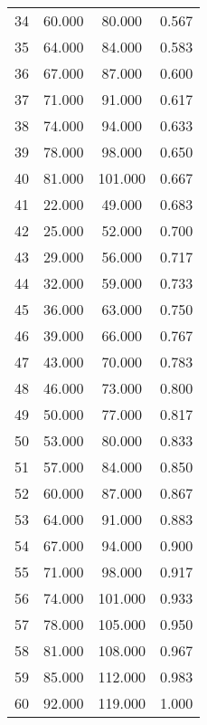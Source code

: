 \begin{tabular}{cccc}
  34 & 60.000 & 80.000 & 0.567 \\ 
  35 & 64.000 & 84.000 & 0.583 \\ 
  36 & 67.000 & 87.000 & 0.600 \\ 
  37 & 71.000 & 91.000 & 0.617 \\ 
  38 & 74.000 & 94.000 & 0.633 \\ 
  39 & 78.000 & 98.000 & 0.650 \\ 
  40 & 81.000 & 101.000 & 0.667 \\ 
  41 & 22.000 & 49.000 & 0.683 \\ 
  42 & 25.000 & 52.000 & 0.700 \\ 
  43 & 29.000 & 56.000 & 0.717 \\ 
  44 & 32.000 & 59.000 & 0.733 \\ 
  45 & 36.000 & 63.000 & 0.750 \\ 
  46 & 39.000 & 66.000 & 0.767 \\ 
  47 & 43.000 & 70.000 & 0.783 \\ 
  48 & 46.000 & 73.000 & 0.800 \\ 
  49 & 50.000 & 77.000 & 0.817 \\ 
  50 & 53.000 & 80.000 & 0.833 \\ 
  51 & 57.000 & 84.000 & 0.850 \\ 
  52 & 60.000 & 87.000 & 0.867 \\ 
  53 & 64.000 & 91.000 & 0.883 \\ 
  54 & 67.000 & 94.000 & 0.900 \\ 
  55 & 71.000 & 98.000 & 0.917 \\ 
  56 & 74.000 & 101.000 & 0.933 \\ 
  57 & 78.000 & 105.000 & 0.950 \\ 
  58 & 81.000 & 108.000 & 0.967 \\ 
  59 & 85.000 & 112.000 & 0.983 \\ 
  60 & 92.000 & 119.000 & 1.000 \\ 
   \hline
\end{tabular}

